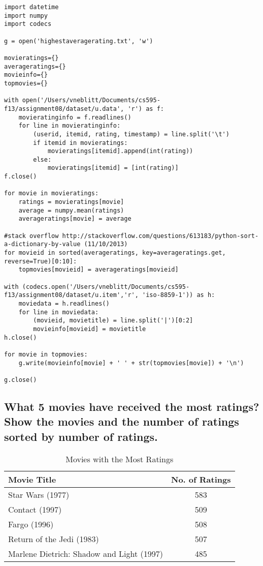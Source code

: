 \documentclass{article}
\begin{document}
\begin{lstlisting}[frame=single, caption=highestavgrating.py, label=highaverage]
import datetime
import numpy
import codecs

g = open('highestaveragerating.txt', 'w')

movieratings={}
averageratings={}
movieinfo={}
topmovies={}

with open('/Users/vneblitt/Documents/cs595-f13/assignment08/dataset/u.data', 'r') as f:
	movieratinginfo = f.readlines()
	for line in movieratinginfo:
		(userid, itemid, rating, timestamp) = line.split('\t')
		if itemid in movieratings:
			movieratings[itemid].append(int(rating))
		else:
			movieratings[itemid] = [int(rating)]
f.close()

for movie in movieratings:
	ratings = movieratings[movie]
	average = numpy.mean(ratings)
	averageratings[movie] = average

#stack overflow http://stackoverflow.com/questions/613183/python-sort-a-dictionary-by-value (11/10/2013)
for movieid in sorted(averageratings, key=averageratings.get, reverse=True)[0:10]:
	topmovies[movieid] = averageratings[movieid]

with (codecs.open('/Users/vneblitt/Documents/cs595-f13/assignment08/dataset/u.item','r', 'iso-8859-1')) as h:
	moviedata = h.readlines()
	for line in moviedata:
		(movieid, movietitle) = line.split('|')[0:2]
		movieinfo[movieid] = movietitle
h.close()

for movie in topmovies:
	g.write(movieinfo[movie] + ' ' + str(topmovies[movie]) + '\n')

g.close()
\end{lstlisting}


\newpage
\subsection{What 5 movies have received the most ratings? Show the movies and the number of ratings sorted by number of ratings.}

\begin{table}[!h]
\centering
\begin{tabular}{l c}
Movie Title & No. of Ratings \\
\hline
Star Wars (1977) & 583  \\
Contact (1997) & 509  \\
Fargo (1996) & 508  \\
Return of the Jedi (1983) & 507  \\
Marlene Dietrich: Shadow and Light (1997) & 485  \\
\hline
\end{tabular}
\caption{Movies with the Most Ratings}
\end{table}
\end{document}
